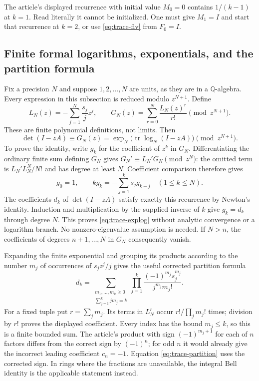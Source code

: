 The article's displayed recurrence with initial value $M_0=0$ contains
$1/(k-1)$ at $k=1$.  Read literally it cannot be initialized.  One must give
$M_1=I$ and start that recurrence at $k=2$, or use
\eqref{eq:trace-flv} from $F_0=I$.

\subsection{Finite formal logarithms, exponentials, and the partition formula}

Fix a precision $N$ and suppose $1,2,\ldots,N$ are units, as they are in a
$\mathbb Q$-algebra.  Every expression in this subsection is reduced modulo
$z^{N+1}$.  Define
\[
 L_N(z)=-\sum_{j=1}^N\frac{s_j}{j}z^j,
 \qquad
 G_N(z)=\sum_{r=0}^N\frac{L_N(z)^r}{r!}\pmod{z^{N+1}}.
\]
These are finite polynomial definitions, not limits.  Then
\begin{equation}
 \det(I-zA)\equiv G_N(z)
   =\exp_N\bigl(\operatorname{tr}\log_N(I-zA)\bigr)
       \pmod{z^{N+1}}.
 \label{eq:trace-explog}
\end{equation}
To prove the identity, write $g_k$ for the coefficient of $z^k$ in $G_N$.
Differentiating the ordinary finite sum defining $G_N$ gives
$G_N'\equiv L_N'G_N\pmod{z^N}$: the omitted term is
$L_N'L_N^N/N!$ and has degree at least $N$.  Coefficient comparison therefore
gives
\[
 g_0=1,\qquad k g_k=-\sum_{j=1}^k s_j g_{k-j}\quad(1\leq k\leq N).
\]
The coefficients $d_k$ of $\det(I-zA)$ satisfy exactly this recurrence by
Newton's identity.  Induction and multiplication by the supplied inverse of
$k$ give $g_k=d_k$ through degree $N$.  This proves
\eqref{eq:trace-explog} without analytic convergence or a logarithm branch.
No nonzero-eigenvalue assumption is needed.  If $N>n$, the coefficients of
degrees $n+1,\ldots,N$ in $G_N$ consequently vanish.

Expanding the finite exponential and grouping its products according to
the number $m_j$ of occurrences of $s_jz^j/j$ gives the useful corrected
partition formula
\begin{equation}
 d_k=
 \sum_{\substack{m_1,\ldots,m_k\geq0\\
                 \sum_{j=1}^k j m_j=k}}
 \prod_{j=1}^k
   \frac{(-1)^{m_j}s_j^{m_j}}{j^{m_j}m_j!}.
 \label{eq:trace-partition}
\end{equation}
For a fixed tuple put $r=\sum_jm_j$.  Its terms in $L_N^r$ occur
$r!/\prod_jm_j!$ times; division by $r!$ proves the displayed coefficient.
Every index has the bound $m_j\leq k$, so this is a finite bounded sum.
The article's product with sign $(-1)^{m_j+1}$ for each of $n$ factors differs
from the correct sign by $(-1)^n$; for odd $n$ it would already give the
incorrect leading coefficient $c_n=-1$.  Equation
\eqref{eq:trace-partition} uses the corrected sign.  In rings where the
fractions are unavailable, the integral Bell identity is the applicable
statement instead.

